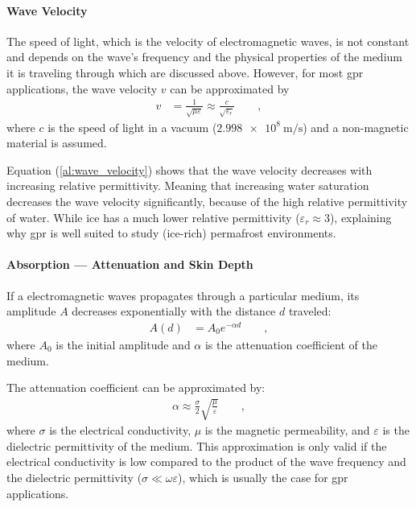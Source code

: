 \paragraph{Wave Velocity}
The speed of light, which is the velocity of electromagnetic waves, is not constant and depends on the wave's frequency and the physical properties of the medium it is traveling through which are discussed above. 
However, for most \gls{gpr} applications, the wave velocity \(v\) can be approximated by 
\begin{align}
    v &= \frac{1}{\sqrt{\mu \varepsilon}} \approx \frac{c}{\sqrt{\varepsilon_r}} \qquad , \label{al:wave_velocity}
\end{align}
where \(c\) is the speed of light in a vacuum (\(\SI{2.998e8}{\meter\per\second}\)) and a non-magnetic material is assumed.

Equation (\ref{al:wave_velocity}) shows that the wave velocity decreases with increasing relative permittivity.
Meaning that increasing water saturation decreases the wave velocity significantly, because of the high relative permittivity of water. 
While ice has a much lower relative permittivity (\(\varepsilon_r \approx 3\)), explaining why \gls{gpr} is well suited to study (ice-rich) permafrost environments.

\paragraph{Absorption --- Attenuation and Skin Depth}
If a electromagnetic waves propagates through a particular medium, its amplitude \(A\) decreases exponentially with the distance \(d\) traveled:
\begin{align}
    A(d) &= A_0 e^{-\alpha d} \qquad ,\label{al:attenuation}
\end{align}
where \(A_0\) is the initial amplitude and \(\alpha\) is the attenuation coefficient of the medium.

The attenuation coefficient can be approximated by:
\begin{align}
    \alpha \approx \frac{\sigma}{2}\sqrt{\frac{\mu}{\varepsilon}} \qquad ,\label{al:attenuation_coefficient}
\end{align}
where \(\sigma\) is the electrical conductivity, \(\mu\) is the magnetic permeability, and \(\varepsilon\) is the dielectric permittivity of the medium.
This approximation is only valid if the electrical conductivity is low compared to the product of the wave frequency and the dielectric permittivity (\(\sigma \ll \omega \varepsilon\)), which is usually the case for \gls{gpr} applications.


